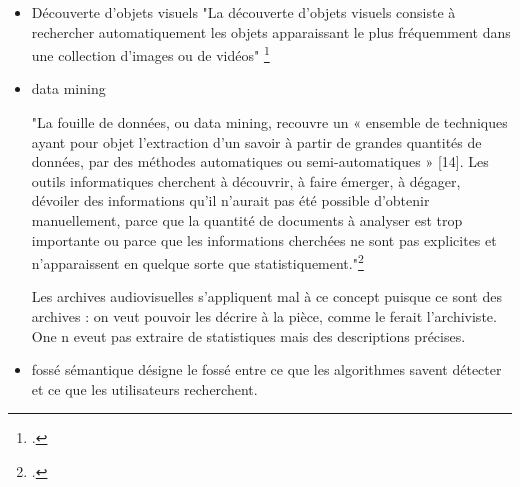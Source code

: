 \begin{itemize}
Indexation sémantique : "Il s’agit de caractériser des plans vidéo en leur assignant des étiquettes (tags) représentant des caractéristiques abstraites (appelées « concepts »)." \footcite{carrive2014}

\item Découverte d'objets visuels 
"La découverte d’objets visuels consiste à rechercher automatiquement les objets apparaissant le plus fréquemment dans une collection d’images ou de vidéos" \footcite{carrive2014}

\item data mining 

"La fouille de données, ou data mining, recouvre un « ensemble de techniques ayant pour objet l’extraction d’un savoir à partir de grandes quantités de données, par des méthodes automatiques ou semi-automatiques » [14]. Les outils informatiques cherchent à découvrir, à faire émerger, à dégager, dévoiler des informations qu’il n’aurait pas été possible d’obtenir manuellement, parce que la quantité de documents à analyser est trop importante ou parce que les informations cherchées ne sont pas explicites et n’apparaissent en quelque sorte que statistiquement."\footcite{carrive2014}

Les archives audiovisuelles s'appliquent mal à ce concept puisque ce sont des archives : on veut pouvoir les décrire à la pièce, comme le ferait l'archiviste. One n eveut pas extraire de statistiques mais des descriptions précises. 

\item fossé sémantique 
désigne le fossé entre ce que les algorithmes savent détecter et ce que les utilisateurs recherchent. 



\end{itemize}

